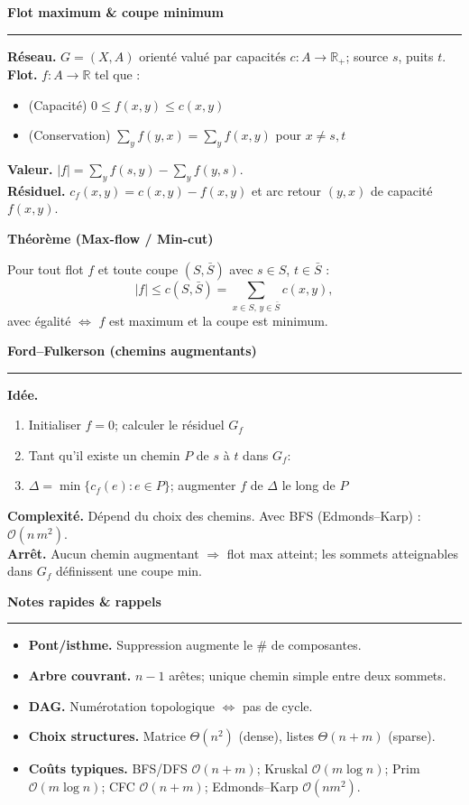 \documentclass[9pt,a4paper]{article}
\newcommand{\bigO}{\mathcal{O}}
\newcommand{\sect}[1]{\vspace{1ex}\textbf{\large #1}\par\vspace{0.3ex}\hrule\vspace{0.6ex}}
\newcommand{\subsect}[1]{\vspace{0.4ex}\textbf{#1}\par}
\begin{document}
\begin{multicols}{3}
    \sect{Flot maximum \& coupe minimum}
    \textbf{Réseau.} $G=(X,A)$ orienté valué par capacités $c:A\to\mathbb{R}_+$; source $s$, puits $t$.\\
    \textbf{Flot.} $f:A\to\mathbb{R}$ tel que :
    \begin{itemize}
        \item (Capacité) $0\le f(x,y)\le c(x,y)$
        \item (Conservation) $\sum_y f(y,x)=\sum_y f(x,y)$ pour $x\neq s,t$
    \end{itemize}
    \textbf{Valeur.} $|f|=\sum_y f(s,y)-\sum_y f(y,s)$.\\
    \textbf{Résiduel.} $c_f(x,y)=c(x,y)-f(x,y)$ et arc retour $(y,x)$ de capacité $f(x,y)$.

    \subsect{Théorème (Max-flow / Min-cut)}
    Pour tout flot $f$ et toute coupe $(S,\bar S)$ avec $s\in S$, $t\in \bar S$ :
    \[
        |f| \le c(S,\bar S)=\sum_{x\in S,\,y\in\bar S} c(x,y),
    \]
    avec égalité $\Leftrightarrow$ $f$ est maximum et la coupe est minimum.

    \sect{Ford--Fulkerson (chemins augmentants)}
    \textbf{Idée.}
    \begin{enumerate}
        \item Initialiser $f=0$; calculer le résiduel $G_f$
        \item Tant qu'il existe un chemin $P$ de $s$ à $t$ dans $G_f$:
        \item \quad $\Delta=\min\{c_f(e): e\in P\}$; augmenter $f$ de $\Delta$ le long de $P$
    \end{enumerate}
    \textbf{Complexité.} Dépend du choix des chemins. Avec BFS (Edmonds--Karp) : $\bigO(n\,m^2)$.\\
    \textbf{Arrêt.} Aucun chemin augmentant $\Rightarrow$ flot max atteint; les sommets atteignables dans $G_f$ définissent une coupe min.

    \sect{Notes rapides \& rappels}
    \begin{itemize}
        \item \textbf{Pont/isthme.} Suppression augmente le \# de composantes.
        \item \textbf{Arbre couvrant.} $n-1$ arêtes; unique chemin simple entre deux sommets.
        \item \textbf{DAG.} Numérotation topologique $\Leftrightarrow$ pas de cycle.
        \item \textbf{Choix structures.} Matrice $\Theta(n^2)$ (dense), listes $\Theta(n+m)$ (sparse).
        \item \textbf{Coûts typiques.} BFS/DFS $\bigO(n+m)$; Kruskal $\bigO(m\log n)$; Prim $\bigO(m\log n)$; CFC $\bigO(n+m)$; Edmonds--Karp $\bigO(n m^2)$.
    \end{itemize}

\end{multicols}
\end{document}
